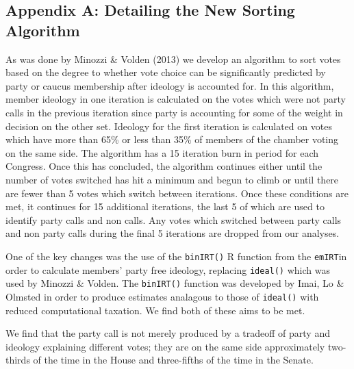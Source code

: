 \documentclass[12pt]{article}
\begin{document}
\renewcommand\thetable{A\arabic{table}}
\renewcommand\thepage{A\arabic{page}}

\clearpage

\subsection*{Appendix A: Detailing the New Sorting Algorithm}
%

As was done by Minozzi \& Volden (2013) we develop an algorithm to sort votes based on the degree to whether vote choice can be significantly predicted by party or caucus membership after ideology is accounted for. In this algorithm, member ideology in one iteration is calculated on the votes which were not party calls in the previous iteration since party is accounting for some of the weight in decision on the other set. Ideology for the first iteration is calculated on votes which have more than 65\% or less than 35\% of members of the chamber voting on the same side. The algorithm has a 15 iteration burn in period for each Congress. Once this has concluded, the algorithm continues either until the number of votes switched has hit a minimum and begun to climb or until there are fewer than 5 votes which switch between iterations. Once these conditions are met, it continues for 15 additional iterations, the last 5 of which are used to identify party calls and non calls. Any votes which switched between party calls and non party calls during the final 5 iterations are dropped from our analyses.

One of the key changes was the use of the \verb|binIRT()| R function from the \verb|emIRT|in order to calculate members' party free ideology, replacing \verb|ideal()| which was used by Minozzi \& Volden. The \verb|binIRT()| function was developed by Imai, Lo \& Olmsted in order to produce estimates analagous to those of \verb|ideal()| with reduced computational taxation. We find both of these aims to be met.

We find that the party call is not merely produced by a tradeoff of party and ideology explaining different votes; they are on the same side approximately two-thirds of the time in the House and three-fifths of the time in the Senate.
\end{document}
